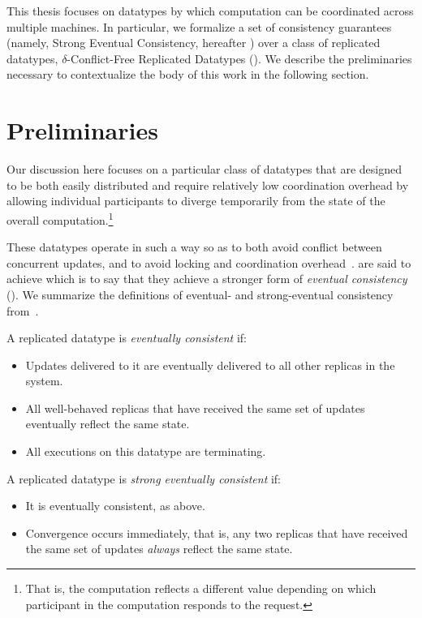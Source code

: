 This thesis focuses on datatypes by which computation can be coordinated across
multiple machines. In particular, we formalize a set of consistency guarantees
(namely, Strong Eventual Consistency, hereafter \SEC) over a class of replicated
datatypes, $\delta$-Conflict-Free Replicated Datatypes (\CRDTs). We describe the
preliminaries necessary to contextualize the body of this work in the following
section.

\section{Preliminaries}
Our discussion here focuses on a particular class of datatypes that are designed
to be both easily distributed and require relatively low coordination overhead
by allowing individual participants to diverge temporarily from the state of the
overall computation.\footnote{That is, the computation reflects a different
value depending on which participant in the computation responds to the
request.}

These datatypes operate in such a way so as to both avoid conflict between
concurrent updates, and to avoid locking and coordination
overhead~\citep{shapiro11}. \CRDTs are said to achieve \SEC which is to say that
they achieve a stronger form of \textit{eventual consistency} (\EC). We
summarize the definitions of eventual- and strong-eventual consistency
from~\cite{shapiro11}.

\begin{definition}
  \label{def:eventual-consistency}
  A replicated datatype is \emph{eventually consistent} if:
  \begin{itemize}
    \item Updates delivered to it are eventually delivered to all other replicas
      in the system.
    \item All well-behaved replicas that have received the same set of updates
      eventually reflect the same state.
    \item All executions on this datatype are terminating.
  \end{itemize}
\end{definition}

\begin{definition}
  A replicated datatype is \emph{strong eventually consistent} if:
  \begin{itemize}
    \item It is eventually consistent, as above.
    \item Convergence occurs immediately, that is, any two replicas that have
      received the same set of updates \emph{always} reflect the same state.
  \end{itemize}
\end{definition}

